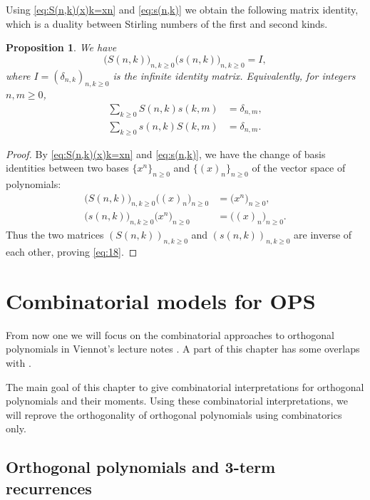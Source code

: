 \documentclass[oneside]{book}
\numberwithin{equation}{section}
\newtheorem{prop}[thm]{Proposition}
\theoremstyle{definition}
\begin{document}
Using \eqref{eq:S(n,k)(x)k=xn} and \eqref{eq:s(n,k)} we obtain the
following matrix identity, which is a duality between Stirling numbers
of the first and second kinds.


\begin{prop}
  We have
 \begin{equation}\label{eq:18}
   \Big(S(n,k)\Big)_{n,k\ge0} \Big(s(n,k)\Big)_{n,k\ge0} = I,
 \end{equation} 
 where \( I= (\delta_{n,k})_{n,k\ge0} \) is the infinite identity
 matrix.
 Equivalently, for integers \( n,m\ge0 \),
 \begin{align}
   \label{eq:S-s-dual}
   \sum_{k\ge0} S(n,k)s(k,m) & = \delta_{n,m},\\
   \label{eq:s-S-dual}
   \sum_{k\ge0} s(n,k)S(k,m) & = \delta_{n,m}.
 \end{align}
\end{prop}

\begin{proof}
  By \eqref{eq:S(n,k)(x)k=xn} and \eqref{eq:s(n,k)}, we have
  the change of basis identities between
  two bases \( \{x^n\}_{n\ge0} \) and \( \{(x)_n\}_{n\ge0} \)
  of the vector space of polynomials:
  \begin{align*}
   \Big(S(n,k)\Big)_{n,k\ge0} \Big((x)_n\Big)_{n\ge0} &=  \Big(x^n\Big)_{n\ge0},\\
   \Big(s(n,k)\Big)_{n,k\ge0} \Big(x^n\Big)_{n\ge0} &=  \Big((x)_n\Big)_{n\ge0}.
 \end{align*}
 Thus the two matrices \( (S(n,k))_{n,k\ge0} \) and
 \( (s(n,k))_{n,k\ge0} \) are inverse of each other, proving
 \eqref{eq:18}.
\end{proof}


\chapter{Combinatorial models for OPS}
\label{sec:comb-interpr-orth}

From now one we will focus on the combinatorial approaches to
orthogonal polynomials in Viennot's lecture notes \cite{ViennotLN}.
A part of this chapter has some overlaps with .

The main goal of this chapter to give combinatorial interpretations
for orthogonal polynomials and their moments. Using these
combinatorial interpretations, we will reprove the orthogonality of
orthogonal polynomials using combinatorics only.

\section{Orthogonal polynomials and 3-term recurrences}
\end{document}
